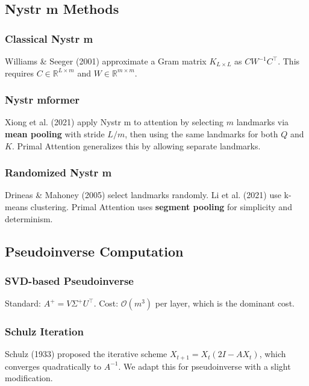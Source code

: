 \subsection{Nystr m Methods}

\subsubsection{Classical Nystr m}

Williams \& Seeger (2001) approximate a Gram matrix $K_{L \times L}$ as 
$C W^{-1} C^\top$. This requires $C \in \mathbb{R}^{L \times m}$ and 
$W \in \mathbb{R}^{m \times m}$.

\subsubsection{Nystr mformer}

Xiong et al. (2021) apply Nystr m to attention by selecting $m$ landmarks 
via \textbf{mean pooling} with stride $L/m$, then using the same landmarks for 
both $Q$ and $K$. Primal Attention generalizes this by allowing separate 
landmarks.

\subsubsection{Randomized Nystr m}

Drineas \& Mahoney (2005) select landmarks randomly. Li et al. (2021) use 
k-means clustering. Primal Attention uses \textbf{segment pooling} for simplicity 
and determinism.

\subsection{Pseudoinverse Computation}

\subsubsection{SVD-based Pseudoinverse}

Standard: $A^+ = V \Sigma^+ U^\top$. Cost: $\mathcal{O}(m^3)$ per layer, 
which is the dominant cost.

\subsubsection{Schulz Iteration}

Schulz (1933) proposed the iterative scheme $X_{t+1} = X_t (2I - A X_t)$, 
which converges quadratically to $A^{-1}$. We adapt this for pseudoinverse 
with a slight modification.

